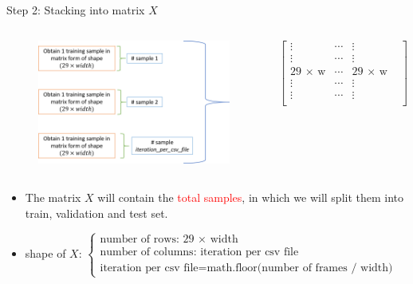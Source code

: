 \documentclass{Beamer}
\begin{document}
\begin{frame}[t]{Step 2: Stacking into matrix $X$}

\begin{columns}[onlytextwidth]




\begin{figure}[h]
\centering
\includegraphics[scale=0.32]{Figures/Data_Preparation_Step_2_Stacking_into_matrix.png}
\end{figure}



$ \begin{bmatrix}

\vdots &  \cdots & \vdots \\
\vdots &  \cdots & \vdots \\

29 \, \times \, \text{w} &  
\cdots & 29 \, \times \, \text{w} &\\

\vdots &  \cdots & \vdots \\
\vdots &  \cdots & \vdots \\
\end{bmatrix}$




\end{columns}

\begin{itemize}

\item The matrix $X$ will contain the \textcolor{red}{total samples}, in which we will split them into train, validation and test set.

\item shape of $X$:
$
\begin{cases}
\text{number of rows: } 29 \, \times \, \text{width} \\
\text{number of columns: } \text{iteration per csv file} \\
\text{iteration per csv file} = \text{math.floor(number of frames / width)}

\end{cases}$

\end{itemize}




\end{frame}
\end{document}
